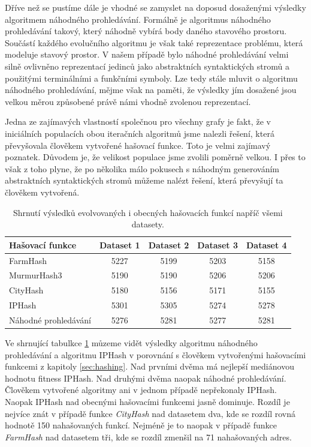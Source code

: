 Dříve než se pustíme dále je vhodné se zamyslet na doposud dosaženými výsledky algoritmem náhodného
prohledávání. Formálně je algoritmus náhodného prohledávání takový, který náhodně vybírá body
daného stavového prostoru. Součástí každého evolučního algoritmu je však také reprezentace problému,
která modeluje stavový prostor. V našem případě bylo náhodné prohledávání velmi silně ovlivněno 
reprezentací jedinců jako abstraktních syntaktických stromů a použitými terminálními a funkčními symboly.
Lze tedy stále mluvit o algoritmu náhodného prohledávání, mějme však na paměti, že výsledky jím
dosažené jsou velkou měrou způsobené právě námi vhodně zvolenou reprezentací.

Jedna ze zajímavých vlastností společnou pro všechny grafy je fakt, že v iniciálních populacích obou
iteračních algoritmů jsme nalezli řešení, která převyšovala člověkem vytvořené hašovací funkce. Toto
je velmi zajímavý poznatek. Důvodem je, že velikost populace jsme zvolili poměrně velkou. I přes to
však z toho plyne, že po několika málo pokusech s náhodným generováním abstraktních syntaktických 
stromů můžeme nalézt řešení, která převyšují ta člověkem vytvořená.

\begin{table}[!ht]
	\centering
	\begin{tabular}{l|c|c|c|c}
		Hašovací funkce & Dataset 1 & Dataset 2 & Dataset 3 & Dataset 4 \\
		\hline
		FarmHash             & 5227 & 5199 & 5203 & 5158 \\
		MurmurHash3    		 & 5190 & 5190 & 5206 & 5206 \\
		CityHash             & 5180 & 5156 & 5171 & 5155 \\
		\hline
		IPHash               & 5301 & 5305 & 5274 & 5278 \\
		Náhodné prohledávání & 5276 & 5281 & 5277 & 5281 \\
		\hline
	\end{tabular}
	\caption{Shrnutí výsledků evolvovaných i obecných hašovacích funkcí napříč všemi datasety.}
	\label{tab:IPHash_conclusion}
\end{table}

Ve shrnující tabulkce \ref{tab:IPHash_conclusion} můzeme vidět výsledky algoritmu náhodného prohledávání
a algoritmu IPHash v porovnání s člověkem vytvořenými hašovacími funkcemi z kapitoly \ref{sec:hashing}.
Nad prvními dvěma má nejlepší mediánovou hodnotu fitness IPHash. Nad druhými dvěma naopak náhodné prohledávání.
Člověkem vytvořené algoritmy ani v jednom případě nepřekonaly IPHash. Naopak IPHash nad obecnými hašovacími
funkcemi jasně dominuje. Rozdíl je nejvíce znát v případě funkce \textit{CityHash} nad datasetem dva, kde se rozdíl
rovná hodnotě 150 nahašovaných funkcí. Nejméně je to naopak v případě funkce \textit{FarmHash} nad datasetem tři,
kde se rozdíl zmenšil na 71 nahašovaných adres.
 
